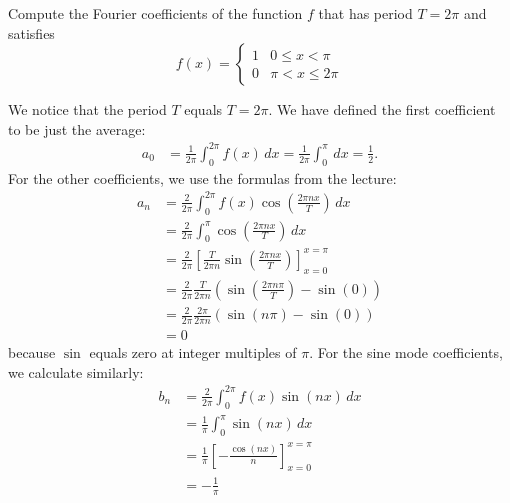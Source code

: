 \documentclass[11pt]{article}
\begin{document}

\begin{exercise}
    Compute the Fourier coefficients of the function $f$ that has period $T = 2\pi$ and satisfies
    \[
        f(x) = \left\{\begin{array}{ll} 1 & 0 \leq x < \pi \\ 0 & \pi < x \leq 2\pi \end{array}\right.
    \]
\end{exercise}
\begin{solution}     
    We notice that the period $T$ equals $T = 2\pi$. 
    We have defined the first coefficient to be just the average:
    \begin{align*}
        a_0 
        &= 
        \frac{1}{2\pi} \int_0^{2\pi} f(x) \, dx 
        = 
        \frac{1}{2\pi} \int_0^\pi \, dx  = \frac 1 2
        .
    \end{align*}
    For the other coefficients, we use the formulas from the lecture:
    \begin{align*}
        a_n 
        &= 
        \frac{2}{2\pi} \int_0^{2\pi} f(x) \cos\left(\frac{2\pi n x}{T}\right) \, dx 
        \\&= 
        \frac{2}{2\pi} \int_0^\pi \cos\left(\frac{2\pi n x}{T}\right) \, dx 
        \\
        &= 
        \frac{2}{2\pi} \left[ \frac{T}{2\pi n} \sin\left(\frac{2\pi n x}{T}\right) \right]_{x=0}^{x=\pi}
        \\&= 
        \frac{2}{2\pi} \frac{T}{2\pi n} \left( \sin\left(\frac{2\pi n \pi}{T}\right) - \sin(0) \right) 
        \\&= 
        \frac{2}{2\pi} \frac{2\pi}{2\pi n} \left( \sin\left(n \pi \right) - \sin(0) \right) 
        \\&= 
        0
    \end{align*}
    because $\sin$ equals zero at integer multiples of $\pi$.
    For the sine mode coefficients, we calculate similarly:
    \begin{align*}
        b_n 
        &= 
        \frac{2}{2\pi}
        \int_0^{2\pi} f(x) \sin(nx) \, dx 
        \\
        &= 
        \frac{1}{\pi}
        \int_0^\pi \sin(nx) \, dx 
        \\
        &= 
        \frac{1}{\pi}
        \left[-\frac{\cos(nx)}{n} \right]_{x=0}^{x=\pi} 
        \\
        &= 
        -
        \frac{1}{\pi}

\end{align*}
\end{solution}
\end{document}
